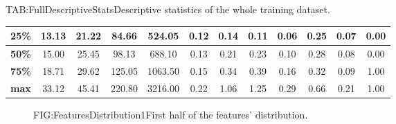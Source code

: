 \begin{landscape}
\begin{table}[Complete Descriptive Statistics]{TAB:FullDescriptiveStats}{Descriptive statistics of the whole training dataset.}
\begin{adjustbox}{width=1\linewidth}
\begin{tabular}{|c|*{11}{c|}}
                \hline
                \textbf{25\%}    & 13.13                           & 21.22                            & 84.66                              & 524.05                        & 0.12                                & 0.14                                 & 0.11                               & 0.06                                    & 0.25                              & 0.07                                       & 0.00                      \\
                \hline
                \textbf{50\%}    & 15.00                           & 25.45                            & 98.13                              & 688.10                        & 0.13                                & 0.21                                 & 0.23                               & 0.10                                    & 0.28                              & 0.08                                       & 0.00                      \\
                \hline
                \textbf{75\%}    & 18.71                           & 29.62                            & 125.05                             & 1063.50                       & 0.15                                & 0.34                                 & 0.39                               & 0.16                                    & 0.32                              & 0.09                                       & 1.00                      \\
                \hline
                \textbf{max}     & 33.12                           & 45.41                            & 220.80                             & 3216.00                       & 0.22                                & 1.06                                 & 1.25                               & 0.29                                    & 0.66                              & 0.21                                       & 1.00                      \\
                \hline
            \end{tabular}
        \end{adjustbox}

    \end{table}


\end{landscape}


\begin{figure}[First half of the features' distribution]{FIG:FeaturesDistribution1}{First half of the features' distribution.}
    \begin{adjustbox}{width=1\textwidth,height=\textheight,keepaspectratio}
    \end{adjustbox}
\end{figure}


